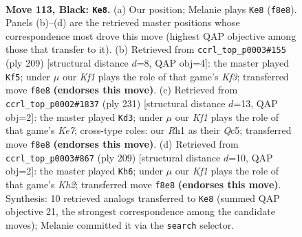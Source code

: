 \documentclass[11pt]{article}
\begin{document}
\clearpage

\begin{figure}[p]\centering
\begin{subfigure}{0.46\textwidth}\centering
\resizebox{\linewidth}{!}{%
\newchessgame
\chessboard[
  setfen={5k2/3R4/4p3/4P3/5PR1/8/5K2/7r b - - 12 113},
  showmover=false,
  pgfstyle=straightmove, color=movearrow, markmove={f8-e8}
]}
\caption{}
\end{subfigure}\hfill
\begin{subfigure}{0.46\textwidth}\centering
\resizebox{\linewidth}{!}{%
\newchessgame
\chessboard[
  setfen={4R3/8/5k2/8/5p2/5P2/6PK/1r6 b - - 18 105},
  showmover=false,
  pgfstyle=straightmove, color=movearrow, markmove={f6-f5}
]}
\caption{}
\end{subfigure}
\\[4pt]
\begin{subfigure}{0.46\textwidth}\centering
\resizebox{\linewidth}{!}{%
\newchessgame
\chessboard[
  setfen={8/5R2/7p/2q5/8/7P/4k1P1/7K b - - 17 116},
  showmover=false,
  pgfstyle=straightmove, color=movearrow, markmove={e2-d3}
]}
\caption{}
\end{subfigure}\hfill
\begin{subfigure}{0.46\textwidth}\centering
\resizebox{\linewidth}{!}{%
\newchessgame
\chessboard[
  setfen={8/7k/5r2/7p/7P/6P1/3R2K1/8 b - - 15 105},
  showmover=false,
  pgfstyle=straightmove, color=movearrow, markmove={h7-h6}
]}
\caption{}
\end{subfigure}
\caption{\textbf{Move 113, Black: \texttt{Ke8}.} (a) Our position; Melanie plays \texttt{Ke8} (\texttt{f8e8}). Panels (b)--(d) are the retrieved master positions whose correspondence most drove this move (highest QAP objective among those that transfer to it). (b) Retrieved from \texttt{ccrl\_top\_p0003\#155} (ply 209) [structural distance $d$=8, QAP obj=4]: the master played \texttt{Kf5}; under $\mu$ our \emph{Kf1} plays the role of that game's \emph{Kf3}; transferred move \texttt{f8e8} \textbf{(endorses this move)}. (c) Retrieved from \texttt{ccrl\_top\_p0002\#1837} (ply 231) [structural distance $d$=13, QAP obj=2]: the master played \texttt{Kd3}; under $\mu$ our \emph{Kf1} plays the role of that game's \emph{Ke7}; cross-type roles: our \emph{R}h1 as their \emph{Q}c5; transferred move \texttt{f8e8} \textbf{(endorses this move)}. (d) Retrieved from \texttt{ccrl\_top\_p0003\#867} (ply 209) [structural distance $d$=10, QAP obj=2]: the master played \texttt{Kh6}; under $\mu$ our \emph{Kf1} plays the role of that game's \emph{Kh2}; transferred move \texttt{f8e8} \textbf{(endorses this move)}. Synthesis: 10 retrieved analogs transferred to \texttt{Ke8} (summed QAP objective 21, the strongest correspondence among the candidate moves); Melanie committed it via the \texttt{search} selector.}
\label{fig:thought-m225}
\end{figure}
\end{document}
